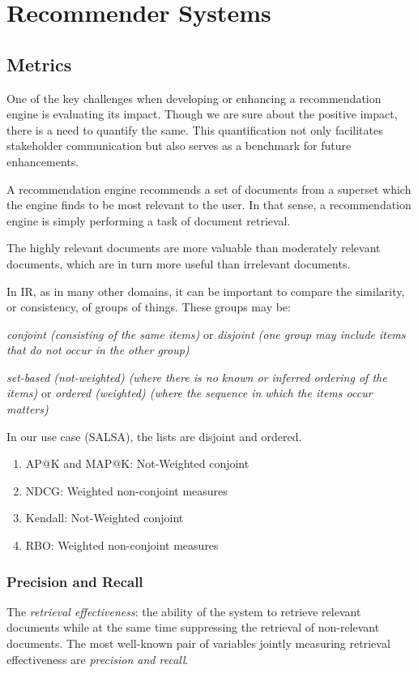 \section{Recommender Systems}
\label{Grelgdnuan_vno_Bleototuh_Lwo_Egerny_BLE}



\subsection{Metrics}
\label{IR Metrics}
One of the key challenges when developing or enhancing a recommendation engine is evaluating its impact. Though we are sure about the positive impact, there is a need to quantify the same. This quantification not only facilitates stakeholder communication but also serves as a benchmark for future enhancements.

A recommendation engine recommends a set of documents from a superset which the engine finds to be most relevant to the user. In that sense, a recommendation engine is simply performing a task of document retrieval.

The highly relevant documents are more valuable than moderately relevant documents, which are in turn more useful than irrelevant documents.

In IR, as in many other domains, it can be important to compare the similarity, or consistency, of groups of things. These groups may be:

\begin{description}
	\item \emph{conjoint (consisting of the same items)} or \emph{disjoint (one group may include items that do not occur in the other group)}
	\item \emph{set-based (not-weighted) (where there is no known or inferred ordering of the items)} or \emph{ordered (weighted) (where the sequence in which the items occur matters)}
\end{description}

In our use case (SALSA), the lists are disjoint and ordered.
\begin{enumerate}
	\item AP@K and MAP@K: Not-Weighted conjoint
	\item NDCG: Weighted non-conjoint measures
	\item Kendall: Not-Weighted conjoint
	\item RBO: Weighted non-conjoint measures
\end{enumerate}

\subsubsection{Precision and Recall}
\label{Precision and Recall}
The \emph{retrieval effectiveness}: the ability of the system to retrieve relevant documents while at the same time suppressing the retrieval of non-relevant documents. 
The most well-known pair of variables jointly measuring retrieval effectiveness are \emph{precision and recall}.

